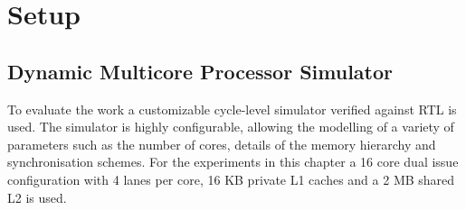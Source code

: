 \section{Setup}


\subsection{Dynamic Multicore Processor Simulator}

To evaluate the work a customizable cycle-level simulator verified against RTL is used.
The simulator is highly configurable, allowing the modelling of a variety of parameters such as the number of cores, details of the memory hierarchy and synchronisation schemes.
For the experiments in this chapter a 16 core dual issue configuration with 4 lanes per core, 16 KB private L1 caches and a 2 MB shared L2 is used.
